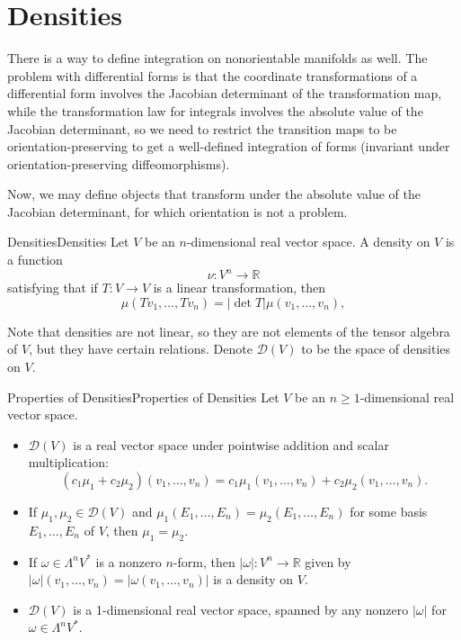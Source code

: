 \documentclass[../main.tex]{subfiles}
\begin{document}
\section{Densities}
There is a way to define integration on nonorientable manifolds as well. The problem with differential forms is that the coordinate transformations of a differential form involves the Jacobian determinant of the transformation map, while the transformation law for integrals involves the absolute value of the Jacobian determinant, so we need to restrict the transition maps to be orientation-preserving to get a well-defined integration of forms (invariant under orientation-preserving diffeomorphisms). 

Now, we may define objects that transform under the absolute value of the Jacobian determinant, for which orientation is not a problem.

\begin{definition}{Densities}{Densities}
  Let $V$ be an $n$-dimensional real vector space. A density on $V$ is a function
  \begin{equation}
    \nu: V^n \to \mathbb{R}
  \end{equation}  
  satisfying that if $T: V \to V$ is a linear transformation, then
  \begin{equation}
    \mu(T v_1, \ldots , T v_n) = |\det T| \mu(v_1, \ldots , v_n),
  \end{equation}
\end{definition}
Note that densities are not linear, so they are not elements of the tensor algebra of $V$, but they have certain relations. Denote $\mathcal{D}(V)$ to be the space of densities on $V$.

\begin{proposition}{Properties of Densities}{Properties of Densities}
  Let $V$ be an $n\geq 1$-dimensional real vector space.
  \begin{itemize}
    \item $\mathcal{D}(V)$ is a real vector space under pointwise addition and scalar multiplication:
      \begin{equation*}
        (c_1 \mu_1 + c_2 \mu_2)(v_1, \ldots , v_n) = c_1 \mu_1(v_1, \ldots , v_n) + c_2 \mu_2(v_1, \ldots , v_n).
      \end{equation*}
    \item If $\mu_1, \mu_2 \in \mathcal{D}(V)$ and $\mu_1(E_1, \ldots , E_n) = \mu_2(E_1, \ldots , E_n)$ for some basis $E_1, \ldots , E_n$ of $V$, then $\mu_1 = \mu_2$.
    \item If $\omega \in \Lambda^n V^*$ is a nonzero $n$-form, then $|\omega|: V^n \to \mathbb{R}$ given by $|\omega|(v_1, \ldots , v_n) = |\omega(v_1, \ldots , v_n)|$ is a density on $V$.
    \item $\mathcal{D}(V)$ is a 1-dimensional real vector space, spanned by any nonzero $|\omega|$ for $\omega \in \Lambda^n V^*$.
  \end{itemize}  
\end{proposition}
\end{document}
